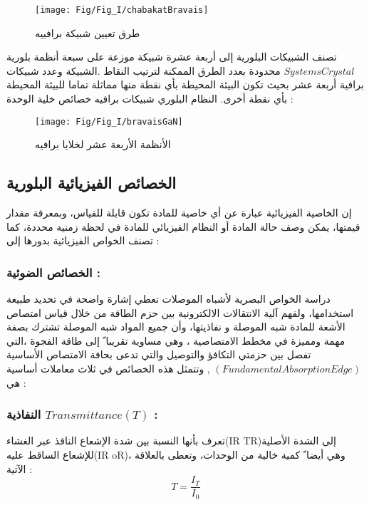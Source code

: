\begin{figure}[bh]
	\centering
	\texttt{[image: Fig/Fig\_I/chabakatBravais]}
	\caption{طرق تعيين شبيكة برافييه}
	\label{fig:chabakatbravais}
\end{figure}
\FloatBarrier

تصنف الشبيكات البلورية إلى أربعة عشرة شبيكة موزعة على سبعة أنظمة بلورية $ Systems Crystal $ محدودة بعدد الطرق الممكنة لترتيب النقاط .الشبيكة وعدد شبيكات برافية أربعة عشر بحيث تكون البيئة المحيطة بأي نقطة منها مماثلة تماما للبيئة المحيطة بأي نقطة أخرى.
النظام البلوري شبيكات برافيه خصائص خلية الوحدة : \cite{a1}

\begin{figure}[th]
	\centering
	\texttt{[image: Fig/Fig\_I/bravaisGaN]}
	\caption{الأنظمة الأربعة عشر لخلايا برافيه }
	\label{fig:bravaisgan}
\end{figure}
\FloatBarrier

\subsection{الخصائص الفيزيائية البلورية }
إن الخاصية الفيزيائية عبارة عن أي خاصية للمادة تكون قابلة للقياس، وبمعرفة مقدار قيمتها، يمكن وصف حالة المادة أو النظام الفيزيائي للمادة في لحظة زمنية محددة، كما تصنف الخواص الفيزيائية بدورها إلى : 

\subsubsection{الخصائص الضوئية :  }
	دراسة الخواص البصرية لأشباه الموصلات تعطي إشارة واضحة في تحديد طبيعة استخدامها، ولفهم آلية الانتقالات الالكترونية بين حزم الطاقة من خلال قياس امتصاص الأشعة للمادة شبه الموصلة و نفاذيتها، وأن جميع المواد شبه الموصلة تشترك بصفة مهمة ومميزة في مخطط الامتصاصية ، وهي مساوية تقريبا ً إلى طاقة الفجوة ،التي تفصل بين حزمتي التكافؤ والتوصيل والتي تدعى بحافة الامتصاص الأساسية $ ( Fundamental Absorption Edge )  $ , وتتمثل هذه الخصائص في ثلاث معاملات أساسية هي : 
\subsubsection*{النفاذية $ Transmittance(T)  $ :  }
		 تعرف بأنها النسبة بين شدة الإشعاع النافذ عبر الغشاء(IR TR)إلى الشدة الأصلية للإشعاع الساقط عليه(IR oR)، وهي أيضا ً كمية خالية من الوحدات، وتعطى بالعلاقة الآتية :  \begin{equation*} 	T = \dfrac{I_{T} }{I_{0}}\end{equation*}
		
